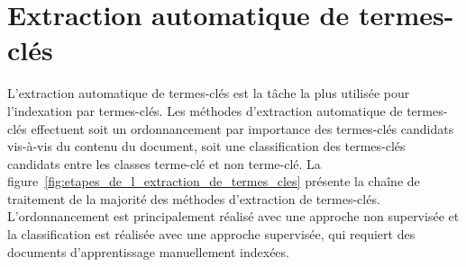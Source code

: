   \section{Extraction automatique de termes-clés}
  \label{sec:main-state_of_the_art-automatic_keyphrase_extraction}
    L'extraction automatique de termes-clés est la tâche la plus utilisée pour
    l'indexation par termes-clés. Les méthodes d'extraction automatique de
    termes-clés effectuent soit un ordonnancement par importance des termes-clés
    candidats vis-à-vis du contenu du document, soit une classification des
    termes-clés candidats entre les classes \og{}terme-clé\fg{} et \og{}non
    terme-clé\fg{}. La figure~\ref{fig:etapes_de_l_extraction_de_termes_cles}
    présente la chaîne de traitement de la majorité des méthodes d'extraction de
    termes-clés. L'ordonnancement est principalement réalisé avec une
    approche non supervisée et la classification est réalisée avec une approche
    supervisée, qui requiert des documents d'apprentissage manuellement indexées.
